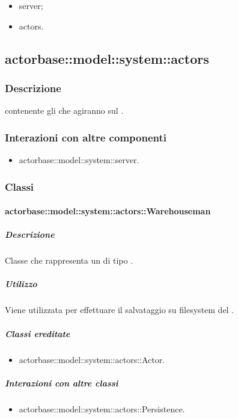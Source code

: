 \documentclass{scalatekids-article}
\begin{document}
\begin{itemize}
\item server;
\item actors.
\end{itemize}

\subsection{actorbase::model::system::actors}

\subsubsection{Descrizione}

 contenente gli  che agiranno sul .

\subsubsection{Interazioni con altre componenti}

\begin{itemize}
\item actorbase::model::system::server.
\end{itemize}

\subsubsection{Classi}

\paragraph{actorbase::model::system::actors::Warehouseman}

\subparagraph{Descrizione}

Classe che rappresenta un  di tipo .

\subparagraph{Utilizzo}

Viene utilizzata per effettuare il salvataggio su filesystem del .

\subparagraph{Classi ereditate}

\begin{itemize}
\item actorbase::model::system::actors::Actor.
\end{itemize}

\subparagraph{Interazioni con altre classi}

\begin{itemize}
\item actorbase::model::system::actors::Persistence.
\end{itemize}
\end{document}
